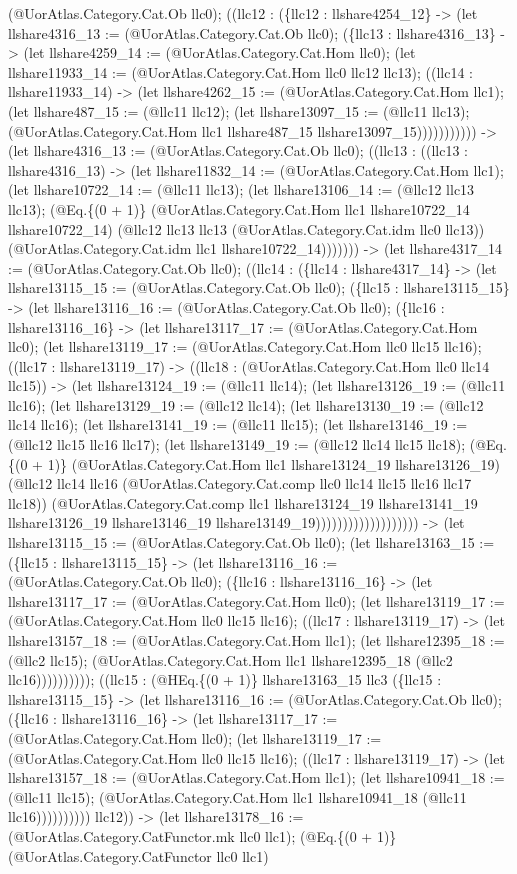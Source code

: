 \documentclass[11pt]{article}
\begin{document}
(@UorAtlas.Category.Cat.Ob llc0); ((llc12 : (\{llc12 : llshare4254\_12\} -> (let llshare4316\_13 := (@UorAtlas.Category.Cat.Ob llc0); (\{llc13 : llshare4316\_13\} -> (let llshare4259\_14 := (@UorAtlas.Category.Cat.Hom llc0); (let llshare11933\_14 := (@UorAtlas.Category.Cat.Hom llc0 llc12 llc13); ((llc14 : llshare11933\_14) -> (let llshare4262\_15 := (@UorAtlas.Category.Cat.Hom llc1); (let llshare487\_15 := (@llc11 llc12); (let llshare13097\_15 := (@llc11 llc13); (@UorAtlas.Category.Cat.Hom llc1 llshare487\_15 llshare13097\_15))))))))))) -> (let llshare4316\_13 := (@UorAtlas.Category.Cat.Ob llc0); ((llc13 : ((llc13 : llshare4316\_13) -> (let llshare11832\_14 := (@UorAtlas.Category.Cat.Hom llc1); (let llshare10722\_14 := (@llc11 llc13); (let llshare13106\_14 := (@llc12 llc13 llc13); (@Eq.\{(0 + 1)\} (@UorAtlas.Category.Cat.Hom llc1 llshare10722\_14 llshare10722\_14) (@llc12 llc13 llc13 (@UorAtlas.Category.Cat.idm llc0 llc13)) (@UorAtlas.Category.Cat.idm llc1 llshare10722\_14))))))) -> (let llshare4317\_14 := (@UorAtlas.Category.Cat.Ob llc0); ((llc14 : (\{llc14 : llshare4317\_14\} -> (let llshare13115\_15 := (@UorAtlas.Category.Cat.Ob llc0); (\{llc15 : llshare13115\_15\} -> (let llshare13116\_16 := (@UorAtlas.Category.Cat.Ob llc0); (\{llc16 : llshare13116\_16\} -> (let llshare13117\_17 := (@UorAtlas.Category.Cat.Hom llc0); (let llshare13119\_17 := (@UorAtlas.Category.Cat.Hom llc0 llc15 llc16); ((llc17 : llshare13119\_17) -> ((llc18 : (@UorAtlas.Category.Cat.Hom llc0 llc14 llc15)) -> (let llshare13124\_19 := (@llc11 llc14); (let llshare13126\_19 := (@llc11 llc16); (let llshare13129\_19 := (@llc12 llc14); (let llshare13130\_19 := (@llc12 llc14 llc16); (let llshare13141\_19 := (@llc11 llc15); (let llshare13146\_19 := (@llc12 llc15 llc16 llc17); (let llshare13149\_19 := (@llc12 llc14 llc15 llc18); (@Eq.\{(0 + 1)\} (@UorAtlas.Category.Cat.Hom llc1 llshare13124\_19 llshare13126\_19) (@llc12 llc14 llc16 (@UorAtlas.Category.Cat.comp llc0 llc14 llc15 llc16 llc17 llc18)) (@UorAtlas.Category.Cat.comp llc1 llshare13124\_19 llshare13141\_19 llshare13126\_19 llshare13146\_19 llshare13149\_19))))))))))))))))))) -> (let llshare13115\_15 := (@UorAtlas.Category.Cat.Ob llc0); (let llshare13163\_15 := (\{llc15 : llshare13115\_15\} -> (let llshare13116\_16 := (@UorAtlas.Category.Cat.Ob llc0); (\{llc16 : llshare13116\_16\} -> (let llshare13117\_17 := (@UorAtlas.Category.Cat.Hom llc0); (let llshare13119\_17 := (@UorAtlas.Category.Cat.Hom llc0 llc15 llc16); ((llc17 : llshare13119\_17) -> (let llshare13157\_18 := (@UorAtlas.Category.Cat.Hom llc1); (let llshare12395\_18 := (@llc2 llc15); (@UorAtlas.Category.Cat.Hom llc1 llshare12395\_18 (@llc2 llc16)))))))))); ((llc15 : (@HEq.\{(0 + 1)\} llshare13163\_15 llc3 (\{llc15 : llshare13115\_15\} -> (let llshare13116\_16 := (@UorAtlas.Category.Cat.Ob llc0); (\{llc16 : llshare13116\_16\} -> (let llshare13117\_17 := (@UorAtlas.Category.Cat.Hom llc0); (let llshare13119\_17 := (@UorAtlas.Category.Cat.Hom llc0 llc15 llc16); ((llc17 : llshare13119\_17) -> (let llshare13157\_18 := (@UorAtlas.Category.Cat.Hom llc1); (let llshare10941\_18 := (@llc11 llc15); (@UorAtlas.Category.Cat.Hom llc1 llshare10941\_18 (@llc11 llc16)))))))))) llc12)) -> (let llshare13178\_16 := (@UorAtlas.Category.CatFunctor.mk llc0 llc1); (@Eq.\{(0 + 1)\} (@UorAtlas.Category.CatFunctor llc0 llc1) 
\end{document}
